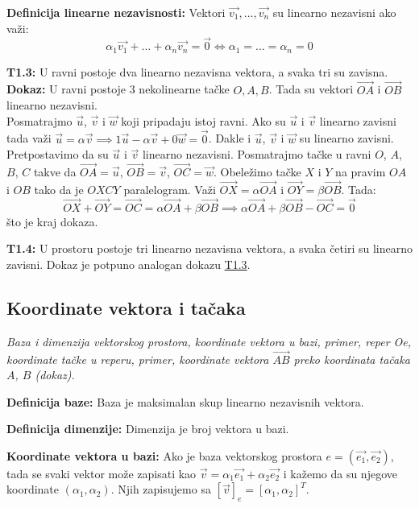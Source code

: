 \documentclass[12pt]{article}
\newcommand{\vek}[1]{\overrightarrow{#1}}
\begin{document}
\textbf{Definicija linearne nezavisnosti:} Vektori $\vek{v_1},\dotsc,\vek{v_n}$
su linearno nezavisni ako važi:
$$\alpha_1\vek{v_1}+\dotsc+\alpha_n\vek{v_n}=\vek{0} \iff \alpha_1=
    \dotsc=\alpha_n=0$$
\par

\textbf{T1.3:}\label{theorem:1.3} U ravni postoje dva linearno nezavisna
vektora, a svaka tri su zavisna.\\
\textbf{Dokaz:} U ravni postoje 3 nekolinearne tačke $O, A, B$. Tada su vektori
$\vek{OA}$ i $\vek{OB}$ linearno nezavisni.\\
Posmatrajmo $\vek{u}$, $\vek{v}$ i $\vek{w}$ koji pripadaju istoj ravni. Ako su
$\vek{u}$ i $\vek{v}$ linearno zavisni tada važi $\vek{u}=\alpha\vek{v}
    \implies 1\vek{u}-\alpha\vek{v}+0\vek{w}=\vek{0}$. Dakle i
$\vek{u}$, $\vek{v}$ i $\vek{w}$ su linearno zavisni.\\
Pretpostavimo da su $\vek{u}$ i $\vek{v}$ linearno nezavisni. Posmatrajmo tačke
u ravni $O$, $A$, $B$, $C$ takve da $\vek{OA}=\vek{u}$, $\vek{OB}=\vek{v}$,
$\vek{OC}=\vek{w}$. Obeležimo tačke $X$ i $Y$ na pravim $OA$ i $OB$ tako da je
$OXCY$ paralelogram. Važi $\vek{OX}=\alpha\vek{OA}$ i $\vek{OY}=\beta
    \vek{OB}$. Tada:
$$\vek{OX}+\vek{OY}=\vek{OC}=\alpha\vek{OA}+\beta\vek{OB} \implies
    \alpha\vek{OA}+\beta\vek{OB}-\vek{OC}=\vek{0}$$
što je kraj dokaza.
\par

\textbf{T1.4:} U prostoru postoje tri linearno nezavisna vektora, a svaka četiri su
linearno zavisni. Dokaz je potpuno analogan dokazu \hyperref[theorem:1.3]{T1.3}.


\subsection{Koordinate vektora i tačaka}
\textit{Baza i dimenzija vektorskog prostora, koordinate vektora u bazi,
    primer, reper Oe, koordinate tačke u reperu, primer, koordinate vektora
    $\vek{AB}$ preko koordinata tačaka $A$, $B$ (dokaz).}
\par
\vspace*{1cm}

\textbf{Definicija baze:} Baza je maksimalan skup linearno nezavisnih vektora.
\par

\textbf{Definicija dimenzije:} Dimenzija je broj vektora u bazi.
\par

\textbf{Koordinate vektora u bazi:} Ako je baza vektorskog prostora
$e=(\vek{e_1}, \vek{e_2})$, tada se svaki vektor može zapisati kao
$\vek{v}=\alpha_1\vek{e_1}+\alpha_2\vek{e_2}$ i kažemo da su njegove
koordinate $(\alpha_1, \alpha_2)$. Njih zapisujemo sa
$[\vek{v}]_e=[\alpha_1, \alpha_2]^T$.
\par
\end{document}
